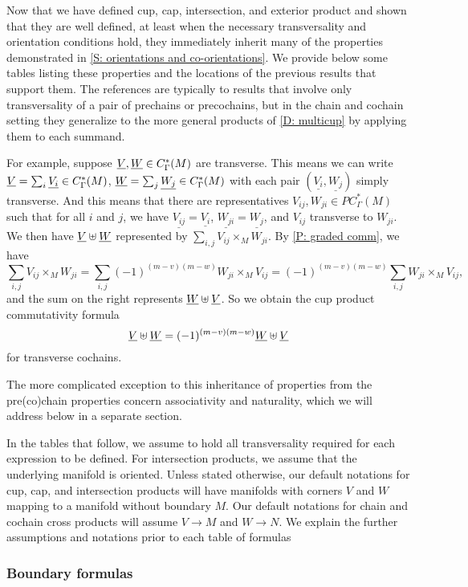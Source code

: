 
Now that we have defined cup, cap, intersection, and exterior product and shown that they are well defined, at least when the necessary transversality and orientation conditions hold, they immediately inherit many of the properties demonstrated in \cref{S: orientations and co-orientations}.
We provide below some tables listing these properties and the locations of the previous results that support them.
The references are typically to results that involve only transversality of a pair of prechains or precochains, but in the chain and cochain setting they generalize to the more general products of \cref{D: multicup} by applying them to each summand.

For example, suppose $\underline{V},\underline{W} \in C^*_\Gamma(M)$ are transverse.
This means we can write $\underline{V} = \sum_i \underline{V_i} \in C_\Gamma^*(M)$, $\underline{W} = \sum_j \underline{W_j} \in C_\Gamma^*(M)$ with each pair $(\underline{V_i},\underline{W_j})$ simply transverse.
And this means that there are representatives $V_{ij},W_{ji} \in PC_\Gamma^*(M)$ such that for all $i$ and $j$, we have $\underline{V_{ij}} = \underline{V_i}$, $\underline{W_{ji}} = \underline{W_j}$, and $V_{ij}$ transverse to $W_{ji}$.
We then have $\underline{V}\uplus \underline{W}$ represented by
$\sum_{i,j} V_{ij} \times_M W_{ji}$.
By \cref{P: graded comm}, we have
$$\sum_{i,j} V_{ij} \times_M W_{ji} = \sum_{i,j} (-1)^{(m-v)(m-w)}W_{ji} \times_M V_{ij} = (-1)^{(m-v)(m-w)}\sum_{i,j} W_{ji} \times_M V_{ij},$$
and the sum on the right represents $\underline{W}\uplus \underline{V}$.
So we obtain the cup product commutativity formula $$\underline{V}\uplus\underline{W} = (-1)^{(m-v)(m-w)}\underline{W}\uplus\underline{V}$$ for transverse cochains.

The more complicated exception to this inheritance of properties from the pre(co)chain properties concern associativity and naturality, which we will address below in a separate section.

In the tables that follow, we assume to hold all transversality required for each expression to be defined.
For intersection products, we assume that the underlying manifold is oriented.
Unless stated otherwise, our default notations for cup, cap, and intersection products will have manifolds with corners $V$ and $W$ mapping to a manifold without boundary $M$.
Our default notations for chain and cochain cross products will assume $V \to M$ and $W \to N$.
We explain the further assumptions and notations prior to each table of formulas

\subsubsection{Boundary formulas}

